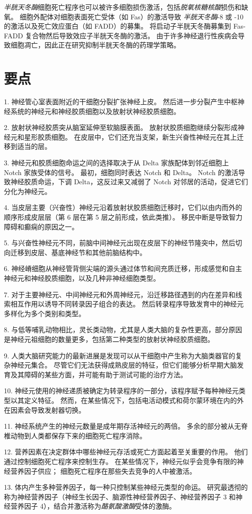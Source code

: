 \textit{半胱天冬酶}细胞死亡程序也可以被许多细胞损伤激活，包括\textit{脱氧核糖核酸}损伤和缺氧。
细胞外配体对细胞表面死亡受体（如 Fas）的激活导致 \textit{半胱天冬酶}-8 或 -10 的激活以及死亡效应蛋白（如 FADD）的募集。
将启动子半胱天冬酶募集到 Fas-FADD 复合物然后导致效应子半胱天冬酶的激活。
由于许多神经退行性疾病会导致细胞凋亡，因此正在研究抑制半胱天冬酶的药理学策略。



\section{要点}

1. 神经管心室表面附近的干细胞分裂扩张神经上皮。
然后进一步分裂产生中枢神经系统的神经元和神经胶质细胞以及放射状神经胶质细胞。


2. 放射状神经胶质突从脑室延伸至软脑膜表面。
放射状胶质细胞继续分裂形成神经元和星形胶质细胞。
在皮层中，它们还充当支架，新生兴奋性神经元在其上迁移到适当的层。


3. 神经元和胶质细胞命运之间的选择取决于从 Delta 家族配体到邻近细胞上 Notch 家族受体的信号。
最初，细胞同时表达 Notch 和 Delta。
Notch 的激活导致神经胶质命运，下调 Delta，这反过来又减弱了 Notch 对邻居的活动，促进它们分化为神经元。


4. 当皮层主要（兴奋性）神经元沿着放射状胶质细胞迁移时，它们以由内而外的顺序形成皮层层（第 6 层在第 5 层之前形成，依此类推）。
移民中断是导致智力障碍和癫痫的原因之一。


5. 与兴奋性神经元不同，前脑中间神经元出现在皮层下的神经节隆突中，然后切向迁移到皮层、基底神经节和其他前脑结构中。


6. 神经嵴细胞从神经管背侧尖端的源头通过体节和间充质迁移，形成感觉和自主神经元和神经胶质细胞，以及几种非神经细胞类型。


7. 对于主要神经元、中间神经元和外周神经元，沿迁移路径遇到的内在差异和线索相互作用以诱导不同转录因子组合的表达。
然后转录程序导致发育中的神经元多样化为多个类别和类型。


8. 与低等哺乳动物相比，灵长类动物，尤其是人类大脑的复杂性更高，部分原因是神经元祖细胞的数量更多，包括第二种类型的放射状神经胶质细胞。


9. 人类大脑研究能力的最新进展是发现可以从干细胞中产生称为大脑类器官的复杂神经元集合。
尽管它们无法获得成熟皮层的特征，但它们能够分析早期大脑发育及其障碍的某些方面，并可能有助于测试可能的治疗方法。


10. 神经元使用的神经递质被确定为转录程序的一部分，该程序赋予每种神经元类型以其定义特征。
然而，在某些情况下，包括电活动模式和荷尔蒙环境在内的外在因素会导致发射器切换。


11. 神经系统产生的神经元数量是成年期存活神经元的两倍。
多余的部分被从无脊椎动物到人类都保存下来的细胞死亡程序消除。


12. 营养因素在决定群体中哪些神经元存活或死亡方面起着至关重要的作用。
他们通过控制细胞死亡程序来控制生存。
在某些情况下，神经元似乎会竞争有限的神经营养因子供应；
细胞死亡程序在那些失去竞争的人中被激活。 


13. 体内产生多种营养因子，每一种只控制某些神经元类型的命运。
研究最透彻的称为神经营养因子（神经生长因子、脑源性神经营养因子、神经营养因子 3 和神经营养因子 4），结合并激活称为\textit{酪氨酸激酶}受体的激酶。



